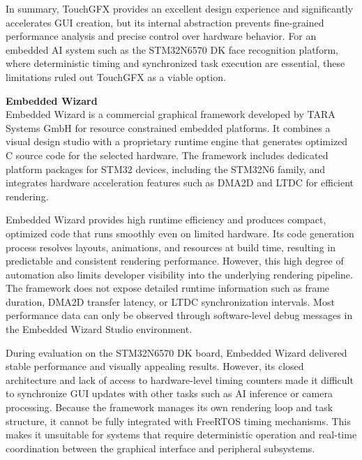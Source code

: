 \vspace{1em}
In summary, TouchGFX provides an excellent design experience and significantly accelerates GUI creation, but its internal abstraction prevents fine-grained performance analysis and precise control over hardware behavior. For an embedded AI system such as the STM32N6570 DK face recognition platform, where deterministic timing and synchronized task execution are essential, these limitations ruled out TouchGFX as a viable option.

\vspace{0.8em}
\textbf{Embedded Wizard}\\
Embedded Wizard is a commercial graphical framework developed by TARA Systems GmbH for resource constrained embedded platforms. It combines a visual design studio with a proprietary runtime engine that generates optimized C source code for the selected hardware. The framework includes dedicated platform packages for STM32 devices, including the STM32N6 family, and integrates hardware acceleration features such as DMA2D and LTDC for efficient rendering.

\vspace{1em}
Embedded Wizard provides high runtime efficiency and produces compact, optimized code that runs smoothly even on limited hardware. Its code generation process resolves layouts, animations, and resources at build time, resulting in predictable and consistent rendering performance. However, this high degree of automation also limits developer visibility into the underlying rendering pipeline. The framework does not expose detailed runtime information such as frame duration, DMA2D transfer latency, or LTDC synchronization intervals. Most performance data can only be observed through software-level debug messages in the Embedded Wizard Studio environment.

\vspace{1em}
During evaluation on the STM32N6570 DK board, Embedded Wizard delivered stable performance and visually appealing results. However, its closed architecture and lack of access to hardware-level timing counters made it difficult to synchronize GUI updates with other tasks such as AI inference or camera processing. Because the framework manages its own rendering loop and task structure, it cannot be fully integrated with FreeRTOS timing mechanisms. This makes it unsuitable for systems that require deterministic operation and real-time coordination between the graphical interface and peripheral subsystems.

